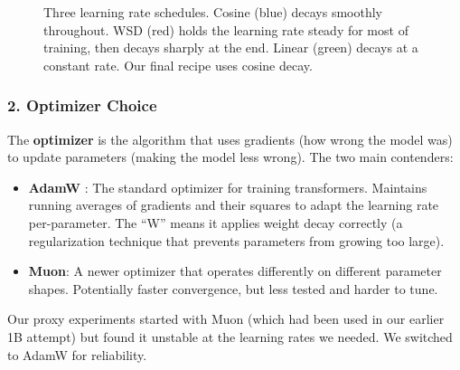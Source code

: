 \documentclass[11pt,a4paper]{article}
\begin{document}
\begin{figure}[H]
\centering
{}
\caption{Three learning rate schedules. Cosine (blue) decays smoothly throughout. WSD (red) holds the learning rate steady for most of training, then decays sharply at the end. Linear (green) decays at a constant rate. Our final recipe uses cosine decay.}
\label{fig:lr_schedules}
\end{figure}

\subsubsection{2. Optimizer Choice}

The \textbf{optimizer} is the algorithm that uses gradients (how wrong the model was) to update parameters (making the model less wrong). The two main contenders:

\begin{itemize}
    \item \textbf{AdamW} \citep{loshchilov2019adamw}: The standard optimizer for training transformers. Maintains running averages of gradients and their squares to adapt the learning rate per-parameter. The ``W'' means it applies weight decay correctly (a regularization technique that prevents parameters from growing too large).
    \item \textbf{Muon}: A newer optimizer that operates differently on different parameter shapes. Potentially faster convergence, but less tested and harder to tune.
\end{itemize}

Our proxy experiments started with Muon (which had been used in our earlier 1B attempt) but found it unstable at the learning rates we needed. We switched to AdamW for reliability.
\end{document}
